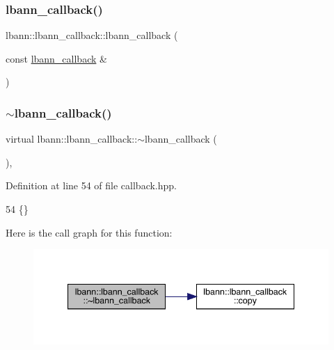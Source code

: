 \subsubsection{\texorpdfstring{lbann\+\_\+callback()}{lbann\_callback()}\hspace{0.1cm}{\footnotesize\ttfamily [2/2]}}
{\footnotesize\ttfamily lbann\+::lbann\+\_\+callback\+::lbann\+\_\+callback (\begin{DoxyParamCaption}\item[{const \hyperlink{classlbann_1_1lbann__callback}{lbann\+\_\+callback} \&}]{ }\end{DoxyParamCaption})\hspace{0.3cm}{\ttfamily [default]}}

\mbox{\label{classlbann_1_1lbann__callback_ac91abaec389f8d2547512c45ae587304}} 
\subsubsection{\texorpdfstring{$\sim$lbann\+\_\+callback()}{~lbann\_callback()}}
{\footnotesize\ttfamily virtual lbann\+::lbann\+\_\+callback\+::$\sim$lbann\+\_\+callback (\begin{DoxyParamCaption}{ }\end{DoxyParamCaption})\hspace{0.3cm}{\ttfamily [inline]}, {\ttfamily [virtual]}}



Definition at line 54 of file callback.\+hpp.


\begin{DoxyCode}
54 \{\}
\end{DoxyCode}
Here is the call graph for this function\+:\nopagebreak
\begin{figure}[H]
\begin{center}
\leavevmode
\includegraphics[width=340pt]{classlbann_1_1lbann__callback_ac91abaec389f8d2547512c45ae587304_cgraph}
\end{center}
\end{figure}


